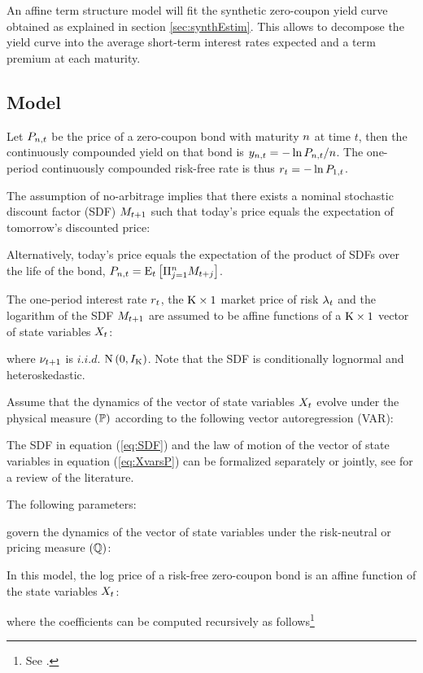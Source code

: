 An affine term structure model will fit the synthetic zero-coupon yield curve obtained as explained in section \ref{sec:synthEstim}. This allows to decompose the yield curve into the average short-term interest rates expected and a term premium at each maturity.

\subsection{Model} \label{sec:ATS_model}
Let $P_{n,t}$ be the price of a zero-coupon bond with maturity $n$ at time $t$, then the continuously compounded yield on that bond is $y_{n,t} = - \ln P_{n,t}/{n} $. The one-period continuously compounded risk-free rate is thus $r_{t} = - \ln P_{1,t}$.

The assumption of no-arbitrage implies that there exists a nominal stochastic discount factor (SDF) $M_{t+1}$ such that today's price equals the expectation of tomorrow's discounted price:
	
Alternatively, today's price equals the expectation of the product of SDFs over the life of the bond, $P_{n,t} = \mathrm{E}_{t} \left[\Pi_{j=1} ^n M_{t+j}\right]$.

The one-period interest rate $r_{t}$, the $\mathrm{K} \times 1$ market price of risk $\lambda_{t}$ and the logarithm of the SDF $M_{t+1}$ are assumed to be affine functions of a $\mathrm{K} \times 1$ vector of state variables $X_{t}$:
	
	
	

where $\nu_{t+1}$ is $i.i.d.$ $\mathrm{N} \left(0,I_{\mathrm{K}}\right)$. Note that the SDF is conditionally lognormal and heteroskedastic.

Assume that the dynamics of the vector of state variables $X_{t}$ evolve under the physical measure $(\mathbb{P})$ according to the following vector autoregression (VAR):
	

The SDF in equation (\ref{eq:SDF}) and the law of motion of the vector of state variables in equation (\ref{eq:XvarsP}) can be formalized separately or jointly, see \cite{GurkaynakWright:2012} for a review of the literature.

The following parameters:
	
	

govern the dynamics of the vector of state variables under the risk-neutral or pricing measure $(\mathbb{Q})$:
	

In this model, the log price of a risk-free zero-coupon bond is an affine function of the state variables $X_{t}$:
	
where the coefficients can be computed recursively as follows\footnote{See \cite{CochranePiazzesi:2008}.}
	
	

